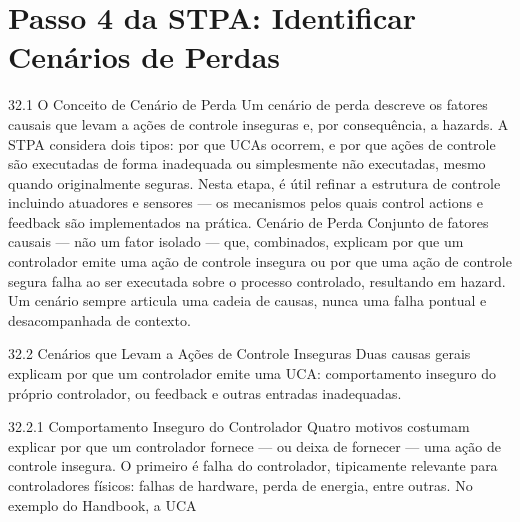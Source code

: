 \chapter{Passo 4 da STPA: Identificar Cenários de Perdas}

32.1 O Conceito de Cenário de Perda Um cenário de perda descreve os fatores causais que levam a ações de controle inseguras e, por consequência, a hazards. A STPA considera dois tipos: por que UCAs ocorrem, e por que ações de controle são executadas de forma inadequada ou simplesmente não executadas, mesmo quando originalmente seguras. Nesta etapa, é útil refinar a estrutura de controle incluindo atuadores e sensores — os mecanismos pelos quais control actions e feedback são implementados na prática. Cenário de Perda Conjunto de fatores causais — não um fator isolado — que, combinados, explicam por que um controlador emite uma ação de controle insegura ou por que uma ação de controle segura falha ao ser executada sobre o processo controlado, resultando em hazard. Um cenário sempre articula uma cadeia de causas, nunca uma falha pontual e desacompanhada de contexto.

32.2 Cenários que Levam a Ações de Controle Inseguras Duas causas gerais explicam por que um controlador emite uma UCA: comportamento inseguro do próprio controlador, ou feedback e outras entradas inadequadas.

32.2.1 Comportamento Inseguro do Controlador Quatro motivos costumam explicar por que um controlador fornece — ou deixa de fornecer — uma ação de controle insegura. O primeiro é falha do controlador, tipicamente relevante para controladores físicos: falhas de hardware, perda de energia, entre outras. No exemplo do Handbook, a UCA

